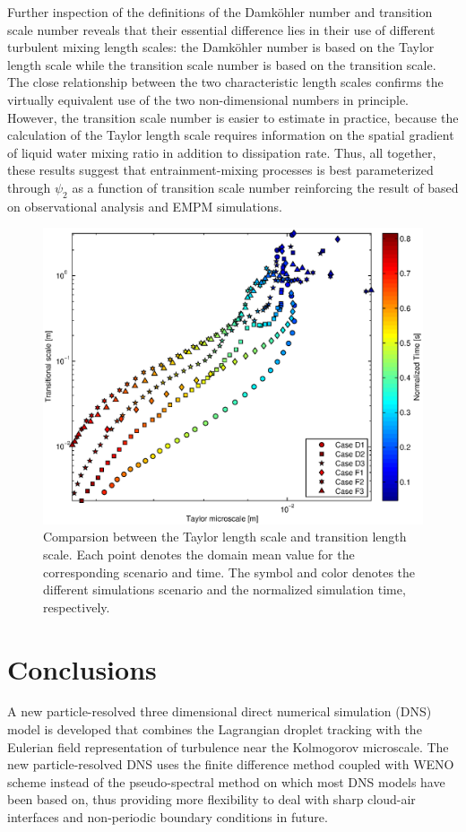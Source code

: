 \documentclass[draft,linenumbers]{agujournal}
\begin{document}
Further inspection of the definitions of the Damk\"ohler number and transition scale number reveals that their essential difference lies in their use of different turbulent mixing length scales: the Damk\"ohler number is based on the Taylor length scale while the transition scale number is based on the transition scale. The close relationship between the two characteristic length scales  confirms the virtually equivalent use of the two non-dimensional numbers in principle. However, the transition scale number is easier to estimate in practice, because the calculation of the Taylor length scale requires information on the spatial gradient of liquid water mixing ratio in addition to dissipation rate. Thus, all together, these results suggest that entrainment-mixing processes is best parameterized through $\psi_2$ as a function of transition scale number reinforcing the result of  \citet{Lu2013} based on observational analysis and EMPM simulations.     
\begin{figure}\centering
\includegraphics[width=0.5\linewidth]{Figures/taylor_trans}
\caption{Comparsion between the Taylor length scale and transition length scale. Each point denotes the domain mean value for the corresponding scenario and time. The symbol and color denotes the different simulations scenario and the normalized simulation time, respectively. \label{fig:TaylorScaleTranScale}}
\end{figure}

\section{Conclusions}\label{conclusion}
A new particle-resolved three dimensional direct numerical simulation (DNS) model is developed that combines the Lagrangian droplet tracking with the Eulerian field representation of turbulence near the Kolmogorov microscale. The new particle-resolved DNS uses the finite difference method coupled with WENO  scheme instead of the pseudo-spectral method on which most DNS models have been based on, thus providing more flexibility to deal with sharp cloud-air interfaces and non-periodic boundary conditions in future.
\end{document}
